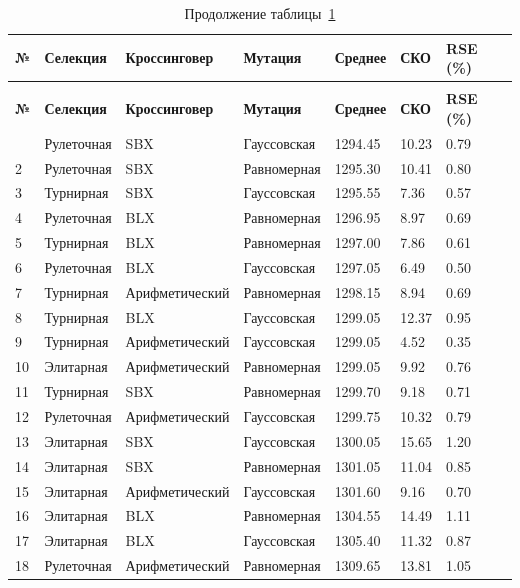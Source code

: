 \begin{longtable}{|p{}|p{}|p{}|p{}|p{}|p{}|p{}|}
	\caption{Результаты для задачи swiss42.tsp. Оптимальное решение 1273.00}\label{tbl:swiss42.tsp} \\
	\hline
	\textbf{№} & \textbf{Селекция} & \textbf{Кроссинговер} & \textbf{Мутация} & \textbf{Среднее} & \textbf{СКО} & \textbf{RSE (\%)} \\
	\hline
	\endfirsthead
	\caption*{Продолжение таблицы~\ref{tbl:swiss42.tsp}} \\
	\hline
	\textbf{№} & \textbf{Селекция} & \textbf{Кроссинговер} & \textbf{Мутация} & \textbf{Среднее} & \textbf{СКО} & \textbf{RSE (\%)} \\
	\hline
	\endhead
	\hline
	\endfoot
	\endlastfoot
	1 & Рулеточная & SBX & Гауссовская & 1294.45 & 10.23 & 0.79 \\
	\hline
	2 & Рулеточная & SBX & Равномерная & 1295.30 & 10.41 & 0.80 \\
	\hline
	3 & Турнирная & SBX & Гауссовская & 1295.55 & 7.36 & 0.57 \\
	\hline
	4 & Рулеточная & BLX & Равномерная & 1296.95 & 8.97 & 0.69 \\
	\hline
	5 & Турнирная & BLX & Равномерная & 1297.00 & 7.86 & 0.61 \\
	\hline
	6 & Рулеточная & BLX & Гауссовская & 1297.05 & 6.49 & 0.50 \\
	\hline
	7 & Турнирная & Арифметический & Равномерная & 1298.15 & 8.94 & 0.69 \\
	\hline
	8 & Турнирная & BLX & Гауссовская & 1299.05 & 12.37 & 0.95 \\
	\hline
	9 & Турнирная & Арифметический & Гауссовская & 1299.05 & 4.52 & 0.35 \\
	\hline
	10 & Элитарная & Арифметический & Равномерная & 1299.05 & 9.92 & 0.76 \\
	\hline
	11 & Турнирная & SBX & Равномерная & 1299.70 & 9.18 & 0.71 \\
	\hline
	12 & Рулеточная & Арифметический & Гауссовская & 1299.75 & 10.32 & 0.79 \\
	\hline
	13 & Элитарная & SBX & Гауссовская & 1300.05 & 15.65 & 1.20 \\
	\hline
	14 & Элитарная & SBX & Равномерная & 1301.05 & 11.04 & 0.85 \\
	\hline
	15 & Элитарная & Арифметический & Гауссовская & 1301.60 & 9.16 & 0.70 \\
	\hline
	16 & Элитарная & BLX & Равномерная & 1304.55 & 14.49 & 1.11 \\
	\hline
	17 & Элитарная & BLX & Гауссовская & 1305.40 & 11.32 & 0.87 \\
	\hline
	18 & Рулеточная & Арифметический & Равномерная & 1309.65 & 13.81 & 1.05 \\
	\hline
\end{longtable}


